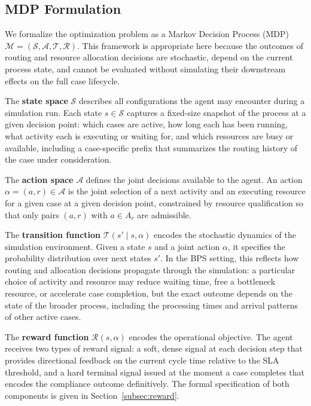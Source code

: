 \documentclass[journal,onecolumn]{IEEEtran}
\begin{document}
\subsection{MDP Formulation}
\label{subsec:mdp_formulation}

We formalize the optimization problem as a Markov Decision Process
(MDP) $\mathcal{M} = (\mathcal{S}, \mathcal{A}, \mathcal{T},
\mathcal{R})$. This framework is appropriate here because the
outcomes of routing and resource allocation decisions are stochastic,
depend on the current process state, and cannot be evaluated without
simulating their downstream effects on the full case lifecycle.

The \textbf{state space} $\mathcal{S}$ describes all configurations
the agent may encounter during a simulation run. Each state $s \in
\mathcal{S}$ captures a fixed-size snapshot of the process at a
given decision point: which cases are active, how long each has been
running, what activity each is executing or waiting for, and which
resources are busy or available, including a case-specific prefix
that summarizes the routing history of the case under consideration.

The \textbf{action space} $\mathcal{A}$ defines the joint decisions
available to the agent. An action $\alpha = (a, r) \in \mathcal{A}$
is the joint selection of a next activity and an executing resource
for a given case at a given decision point, constrained by resource
qualification so that only pairs $(a, r)$ with $a \in A_r$ are
admissible.

The \textbf{transition function} $\mathcal{T}(s' \mid s, \alpha)$
encodes the stochastic dynamics of the simulation environment.
Given a state $s$ and a joint action $\alpha$, it specifies the
probability distribution over next states $s'$. In the BPS setting,
this reflects how routing and allocation decisions propagate through
the simulation: a particular choice of activity and resource may
reduce waiting time, free a bottleneck resource, or accelerate case
completion, but the exact outcome depends on the state of the
broader process, including the processing times and arrival patterns
of other active cases.

The \textbf{reward function} $\mathcal{R}(s, \alpha)$ encodes the
operational objective. The agent receives two types of reward
signal: a soft, dense signal at each decision step that provides
directional feedback on the current cycle time relative to the SLA
threshold, and a hard terminal signal issued at the moment a case
completes that encodes the compliance outcome definitively. The
formal specification of both components is given in
Section~\ref{subsec:reward}.
\end{document}

